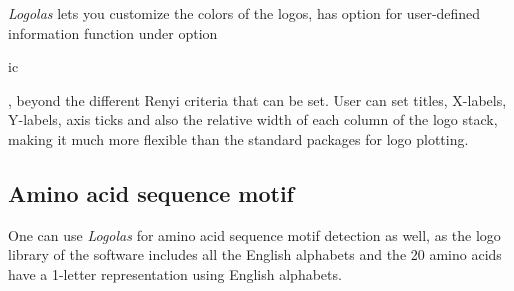 \documentclass[12pt]{article}\usepackage[]{graphicx}\usepackage[usenames,dvipsnames]{color}
\newcommand{\Logolas}{\textit{Logolas}}
\begin{document}
\newpage

\Logolas{} lets you customize the colors of the logos, has option for user-defined information function under option \begin{verb} ic \end{verb},  beyond the different Renyi criteria that can be set. User can set titles, X-labels, Y-labels, axis ticks and also the relative width of each column of the logo stack, making it much more flexible than the standard packages for logo plotting.

\subsection{Amino acid sequence motif}

One can use \Logolas{} for amino acid sequence motif detection as well, as the logo library of the software includes all the English alphabets and the 20 amino acids have a 1-letter representation using English alphabets.
\end{document}
